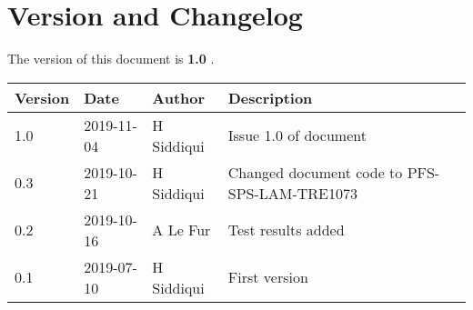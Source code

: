 \section{Version and Changelog}

The version of this document is {\bf 1.0} .

\begin{table}[H]
    \begin{tabular}{|l|l|l|p{10cm}| }
    \hline
    {\bf Version} & {\bf Date} & {\bf Author} & {\bf Description} \\ \hline
    1.0 & 2019-11-04 & H Siddiqui & Issue 1.0 of document\\ \hline
    0.3 & 2019-10-21 & H Siddiqui & Changed document code to PFS-SPS-LAM-TRE1073 \\ \hline
    0.2 & 2019-10-16 & A Le Fur & Test results added \\ \hline
    0.1 & 2019-07-10 & H Siddiqui & First version \\ \hline
    \end{tabular}
\end{table}
